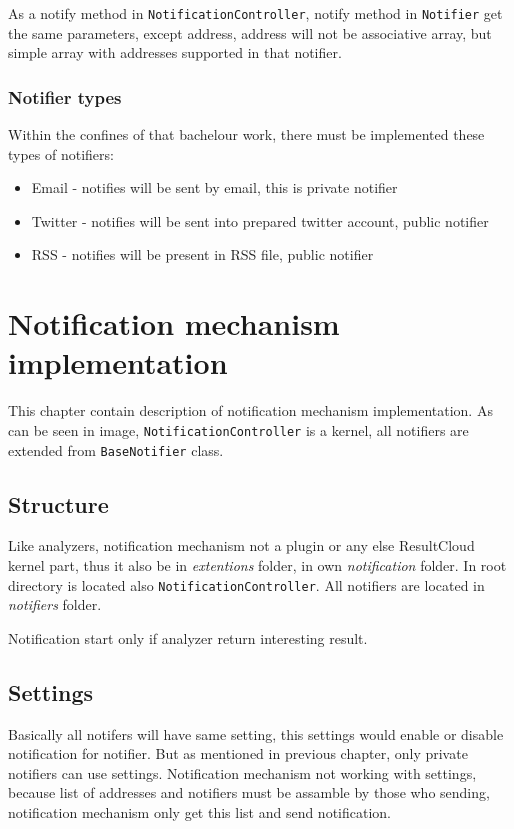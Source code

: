As a notify method in \texttt{NotificationController}, notify method in \texttt{Notifier} get the same parameters, except address, address will not be associative array, but simple array with addresses supported in that notifier. 

\subsection{Notifier types}

Within the confines of that bachelour work, there must be implemented these types of notifiers:
\begin{itemize} 
\item Email - notifies will be sent by email, this is private notifier
\item Twitter - notifies will be sent into prepared twitter account, public notifier
\item RSS - notifies will be present in RSS file, public notifier
\end{itemize}  

\chapter{Notification mechanism implementation}
\label{ch:notification_implement}

This chapter contain description of notification mechanism implementation. As can be seen in image, \texttt{NotificationController} is a kernel, all notifiers are extended from \texttt{BaseNotifier} class.

\section{Structure}

Like analyzers, notification mechanism not a plugin or any else ResultCloud kernel part, thus it also be in \emph{extentions} folder, in own \emph{notification} folder. In root directory is located also \texttt{NotificationController}. All notifiers are located in \emph{notifiers} folder.

Notification start only if analyzer return interesting result.

\section{Settings}

Basically all notifers will have same setting, this settings would enable or disable notification for notifier. But as mentioned in previous chapter, only private notifiers can use settings. Notification mechanism not working with settings, because list of addresses and notifiers must be assamble by those who sending, notification mechanism only get this list and send notification. 

